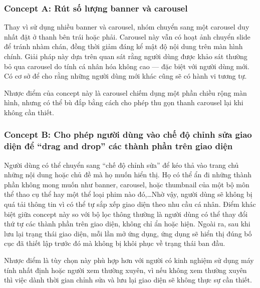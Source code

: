 \subsubsection{Concept A: Rút số lượng banner và carousel}
Thay vì sử dụng nhiều banner và carousel, nhóm chuyển sang một carousel duy nhất đặt ở thanh bên trái hoặc phải. Carousel này vẫn có hoạt ảnh chuyển slide để tránh nhàm chán, đồng thời giảm đáng kể mật độ nội dung trên màn hình chính. Giải pháp này dựa trên quan sát rằng người dùng được khảo sát thường bỏ qua carousel do tính cá nhân hóa không cao — đặc biệt với người dùng mới. Có cơ sở để cho rằng những người dùng mới khác cũng sẽ có hành vi tương tự.

Nhược điểm của concept này là carousel chiếm dụng một phần chiều rộng màn hình, nhưng có thể bù đắp bằng cách cho phép thu gọn thanh carousel lại khi không cần thiết.

\subsubsection{Concept B: Cho phép người dùng vào chế độ chỉnh sửa giao diện để ``drag and drop'' các thành phần trên giao diện}
Người dùng có thể chuyển sang ``chế độ chỉnh sửa'' để kéo thả vào trang chủ những nội dung hoặc chủ đề mà họ muốn hiển thị. Họ có thể ẩn đi những thành phần không mong muốn như banner, carousel, hoặc thumbnail của một bộ môn thể thao cụ thể hay một thể loại phim nào đó,\dots Nhờ vậy, người dùng sẽ không bị quá tải thông tin vì có thể tự sắp xếp giao diện theo nhu cầu cá nhân. Điểm khác biệt giữa concept này so với bộ lọc thông thường là người dùng có thể thay đổi thứ tự các thành phần trên giao diện, không chỉ ẩn hoặc hiện. Ngoài ra, sau khi lưu lại trạng thái giao diện, mỗi lần mở ứng dụng, ứng dụng sẽ hiển thị đúng bố cục đã thiết lập trước đó mà không bị khôi phục về trạng thái ban đầu.

Nhược điểm là tùy chọn này phù hợp hơn với người có kinh nghiệm sử dụng máy tính nhất định hoặc người xem thường xuyên, vì nếu không xem thường xuyên thì việc dành thời gian chỉnh sửa và lưu lại giao diện sẽ không thực sự cần thiết.